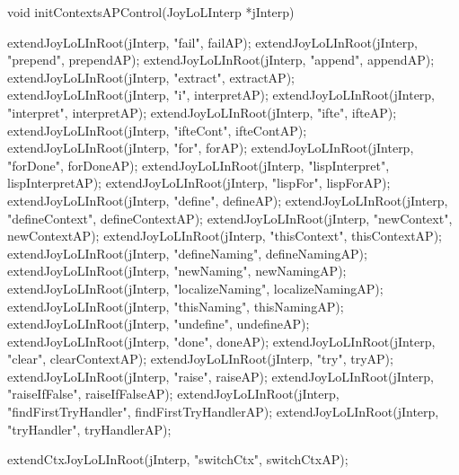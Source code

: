 \startCCode
void initContextsAPControl(JoyLoLInterp *jInterp) {
  extendJoyLoLInRoot(jInterp, "fail",                failAP);
  extendJoyLoLInRoot(jInterp, "prepend",             prependAP);
  extendJoyLoLInRoot(jInterp, "append",              appendAP);
  extendJoyLoLInRoot(jInterp, "extract",             extractAP);
  extendJoyLoLInRoot(jInterp, "i",                   interpretAP);
  extendJoyLoLInRoot(jInterp, "interpret",           interpretAP);
  extendJoyLoLInRoot(jInterp, "ifte",                ifteAP);
  extendJoyLoLInRoot(jInterp, "ifteCont",            ifteContAP);
  extendJoyLoLInRoot(jInterp, "for",                 forAP);
  extendJoyLoLInRoot(jInterp, "forDone",             forDoneAP);
  extendJoyLoLInRoot(jInterp, "lispInterpret",       lispInterpretAP);
  extendJoyLoLInRoot(jInterp, "lispFor",             lispForAP);
  extendJoyLoLInRoot(jInterp, "define",              defineAP);
  extendJoyLoLInRoot(jInterp, "defineContext",       defineContextAP);
  extendJoyLoLInRoot(jInterp, "newContext",          newContextAP);
  extendJoyLoLInRoot(jInterp, "thisContext",         thisContextAP);
  extendJoyLoLInRoot(jInterp, "defineNaming",        defineNamingAP);
  extendJoyLoLInRoot(jInterp, "newNaming",           newNamingAP);
  extendJoyLoLInRoot(jInterp, "localizeNaming",      localizeNamingAP);
  extendJoyLoLInRoot(jInterp, "thisNaming",          thisNamingAP);
  extendJoyLoLInRoot(jInterp, "undefine",            undefineAP);
  extendJoyLoLInRoot(jInterp, "done",                doneAP);
  extendJoyLoLInRoot(jInterp, "clear",               clearContextAP);
  extendJoyLoLInRoot(jInterp, "try",                 tryAP);
  extendJoyLoLInRoot(jInterp, "raise",               raiseAP);
  extendJoyLoLInRoot(jInterp, "raiseIfFalse",        raiseIfFalseAP);
  extendJoyLoLInRoot(jInterp, "findFirstTryHandler", findFirstTryHandlerAP);
  extendJoyLoLInRoot(jInterp, "tryHandler",          tryHandlerAP);
  
  extendCtxJoyLoLInRoot(jInterp, "switchCtx",        switchCtxAP);
}
\stopCCode